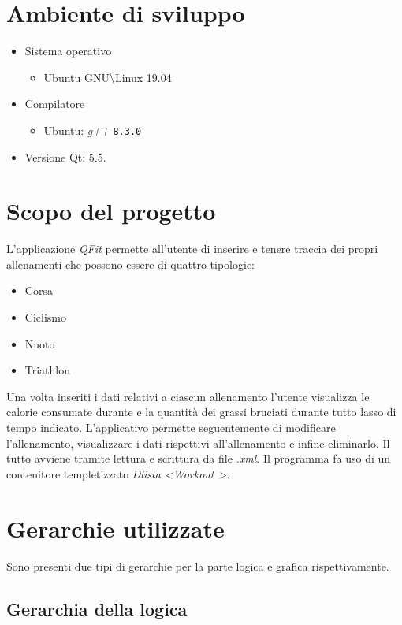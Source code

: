 \documentclass[12pt, a4paper]{article}
\begin{document}
\section{Ambiente di sviluppo}
\vspace{10px}
\begin{itemize}
\item Sistema operativo
\begin{itemize}
	\item Ubuntu GNU\textbackslash Linux 19.04
\end{itemize}	
	\item Compilatore
	\begin{itemize}
		\item Ubuntu: \emph{g++}  \texttt{8.3.0} 
	\end{itemize}
	\item Versione Qt: 5.5.
\end{itemize}

\section{Scopo del progetto}
L'applicazione \emph{QFit} permette all'utente di inserire e tenere traccia dei propri allenamenti che possono essere di quattro tipologie: 
\begin{itemize}
\item Corsa
\item Ciclismo
\item Nuoto
\item Triathlon
\end{itemize}

Una volta inseriti i dati relativi a ciascun allenamento l'utente visualizza le calorie consumate durante e la quantità dei grassi bruciati durante tutto lasso di tempo indicato.
L'applicativo permette seguentemente di modificare l'allenamento, visualizzare i dati rispettivi all'allenamento e infine eliminarlo.
Il tutto avviene tramite lettura e scrittura da file \emph{.xml}.
Il programma fa uso di un contenitore templetizzato \emph{Dlista \textless Workout \textgreater}.
\newpage
\section{Gerarchie utilizzate}
Sono presenti due tipi di gerarchie per la parte logica e grafica rispettivamente.
\subsection{Gerarchia della logica}
\end{document}

